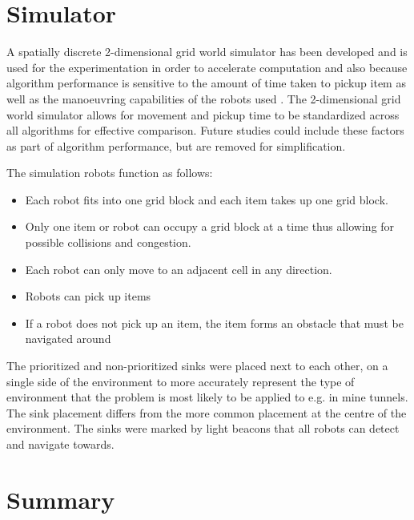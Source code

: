 \section{Simulator}
A spatially discrete 2-dimensional grid world simulator has been developed and is used for the experimentation in order to accelerate computation \cite{sugawara2002swarming} and also because algorithm performance is sensitive to the amount of time taken to pickup item as well as the manoeuvring capabilities of the robots used \cite{ostergaard2001emergent}. The 2-dimensional grid world simulator allows for movement and pickup time to be standardized across all algorithms for effective comparison. Future studies could include these factors as part of algorithm performance, but are removed for simplification. 

The simulation robots function as follows:
\begin{itemize}
\item Each robot fits into one grid block and each item takes up one grid block. 
\item Only one item or robot can occupy a grid block at a time thus allowing for possible collisions and congestion. 
\item Each robot can only move to an adjacent cell in any direction.
\item Robots can pick up items
\item If a robot does not pick up an item, the item forms an obstacle that must be navigated around
\end{itemize}


The prioritized and non-prioritized sinks were placed next to each other, on a single side of the environment to more accurately represent the type of environment that the problem is most likely to be applied to e.g. in mine tunnels. The sink placement differs from the more common placement at the centre of the environment. The sinks were marked by light beacons that all robots can detect and navigate towards.


\section{Summary}
\label{robots:summary}

